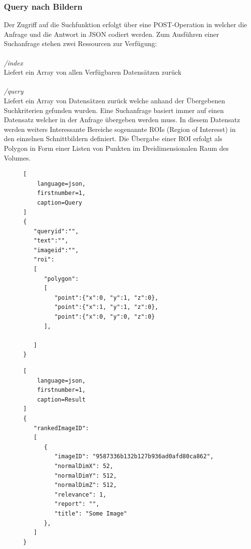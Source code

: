 \subsubsection{Query nach Bildern}
\label{sec:Query nach Bildern}
Der Zugriff auf die Suchfunktion erfolgt über eine POST-Operation in welcher die Anfrage und die Antwort in JSON codiert werden.
Zum Ausführen einer Suchanfrage stehen zwei Ressourcen zur Verfügung:
\\
\\
\textit{/index}\\
Liefert ein Array von allen Verfügbaren Datensätzen zurück 
\\
\\
\textit{/query}\\
Liefert ein Array von Datensätzen zurück welche anhand der Übergebenen Suchkriterien gefunden wurden.
Eine Suchanfrage basiert immer auf einen Datensatz welcher in der Anfrage übergeben werden muss.
In diesem Datensatz werden weiters Interessante Bereiche sogenannte ROIs (Region of Interesst) in den einzelnen Schnittbildern definiert.
Die Übergabe einer ROI erfolgt als Polygon in Form einer Listen von Punkten im Dreidimensionalen Raum des Volumes.
\begin{figure}[t]
\begin{lstlisting}[
	language=json,
	firstnumber=1,
	caption=Query
]
{
   "queryid":"",
   "text":"",
   "imageid":"",
   "roi": 
   [
      "polygon":
      [
         "point":{"x":0, "y":1, "z":0},
         "point":{"x":1, "y":1, "z":0},
         "point":{"x":0, "y":0, "z":0}
      ],

   ]
}
\end{lstlisting}
\end{figure}


\begin{figure}[t]
\begin{lstlisting}[
	language=json,
	firstnumber=1,
	caption=Result
]
{
   "rankedImageID": 
   [
      {
         "imageID": "9587336b132b127b936ad0afd80ca862",
         "normalDimX": 52,
         "normalDimY": 512,
         "normalDimZ": 512,
         "relevance": 1,
         "report": "",
         "title": "Some Image"
      },
   ]
}
\end{lstlisting}
\end{figure}

